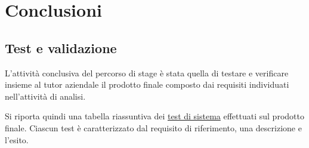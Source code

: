 \chapter{Conclusioni}
\label{cap:conclusioni}


\setlength{\parskip}{3ex}

\section{Test e validazione}
L'attività conclusiva del percorso di stage è stata quella di testare e verificare insieme al tutor aziendale il prodotto finale composto dai requisiti individuati nell'attività di analisi.

\setlength{\parskip}{3ex} 

\noindent Si riporta quindi una tabella riassuntiva dei {\hyperref[sec:test-definition]{test di sistema}}\glsfirstoccur \; effettuati sul prodotto finale. Ciascun test è caratterizzato dal requisito di riferimento, una descrizione e l'esito.

\pagebreak

